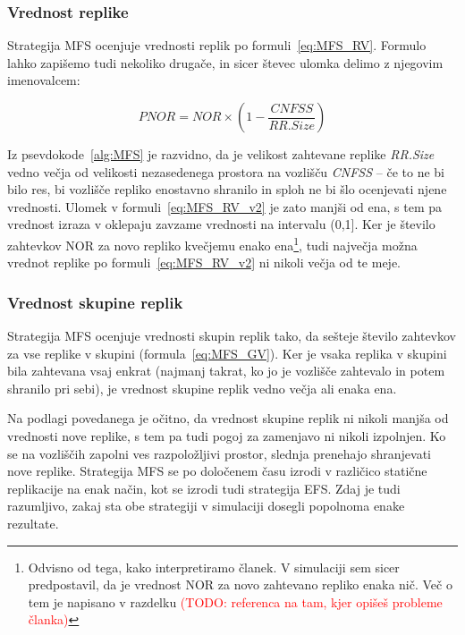 \documentclass[a4paper, 12pt]{book}
\newcommand{\TODO}[1]{\textcolor{red}{(TODO: #1)}}
\begin{document}
\subsubsection{Vrednost replike}

Strategija MFS ocenjuje vrednosti replik po formuli~\eqref{eq:MFS_RV}.
Formulo lahko zapišemo tudi nekoliko drugače, in sicer števec ulomka delimo z
njegovim imenovalcem:

\begin{equation}
  \mathit{PNOR} = \mathit{NOR} \times
                 \left(1 - \frac{\mathit{CNFSS}}{\mathit{ RR.Size}}\right)
  \label{eq:MFS_RV_v2}
\end{equation}

Iz psevdokode~\ref{alg:MFS} je razvidno, da je velikost zahtevane replike
\textit{RR.Size} vedno večja od velikosti nezasedenega prostora na vozlišču
\textit{CNFSS} -- če to ne bi bilo res, bi vozlišče repliko enostavno shranilo
in sploh ne bi šlo ocenjevati njene vrednosti. Ulomek v
formuli~\eqref{eq:MFS_RV_v2} je zato manjši od ena, s tem pa vrednost izraza v
oklepaju zavzame vrednosti na intervalu (0,1].
Ker je število zahtevkov NOR za novo repliko kvečjemu enako
ena\footnote{Odvisno od tega, kako interpretiramo članek. V simulaciji sem
sicer predpostavil, da je vrednost NOR za novo zahtevano repliko enaka nič.
Več o tem je napisano v razdelku \TODO{referenca na tam, kjer opišeš
probleme članka}},
tudi največja možna vrednot replike po formuli~\eqref{eq:MFS_RV_v2} ni
nikoli večja od te meje.

\subsubsection{Vrednost skupine replik}

Strategija MFS ocenjuje vrednosti skupin replik tako, da sešteje število
zahtevkov za vse replike v skupini (formula~\eqref{eq:MFS_GV}). Ker je
vsaka replika v skupini bila zahtevana vsaj enkrat (najmanj takrat, ko jo
je vozlišče zahtevalo in potem shranilo pri sebi), je vrednost skupine replik
vedno večja ali enaka ena.

Na podlagi povedanega je očitno, da vrednost skupine replik ni nikoli manjša
od vrednosti nove replike, s tem pa tudi pogoj za zamenjavo ni nikoli
izpolnjen. Ko se na vozliščih zapolni ves razpoložljivi prostor, slednja
prenehajo shranjevati nove replike. Strategija MFS se po določenem času
izrodi v različico statične replikacije na enak način, kot se izrodi
tudi strategija EFS. Zdaj je tudi razumljivo, zakaj sta obe strategiji v
simulaciji dosegli popolnoma enake rezultate.
\end{document}
